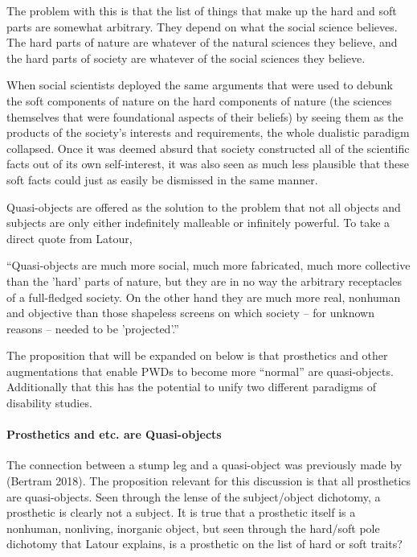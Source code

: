 \documentclass[a4paper]{article}
\begin{document}
The problem with this is that the list of things that make up the hard and
soft parts are somewhat arbitrary. They depend on what the social science
believes. The hard parts of nature are whatever of the natural sciences they
believe, and the hard parts of society are whatever of the social sciences
they believe. 

When social scientists deployed the same arguments that were used to debunk
the soft components of nature on the hard components of nature (the sciences
themselves that were foundational aspects of their beliefs) by seeing them as
the products of the society's interests and requirements, the whole dualistic
paradigm collapsed. Once it was deemed absurd that society constructed all of
the scientific facts out of its own self-interest, it was also seen as much
less plausible that these soft facts could just as easily be dismissed in the
same manner.

Quasi-objects are offered as the solution to the problem that not all objects
and subjects are only either indefinitely malleable or infinitely powerful. To
take a direct quote from Latour,

``Quasi-objects are much more social, much more fabricated, much more
collective than the 'hard' parts of nature, but they are in no way the
arbitrary receptacles of a full-fledged society. On the other hand they are
much more real, nonhuman and objective than those shapeless screens on which
society – for unknown reasons – needed to be 'projected'.''

The proposition that will be expanded on below is that prosthetics and other
augmentations that enable PWDs to become more ``normal'' are quasi-objects.
Additionally that this has the potential to unify two different paradigms of
disability studies. 

\paragraph{Prosthetics and etc. are Quasi-objects}

The connection between a stump leg and a quasi-object was previously made by
(Bertram 2018). The proposition relevant for this discussion is that all
prosthetics are quasi-objects. Seen through the lense of the subject/object
dichotomy, a prosthetic is clearly not a subject. It is true that a prosthetic
itself is a nonhuman, nonliving, inorganic object, but seen through the
hard/soft pole dichotomy that Latour explains, is a prosthetic on the list of
hard or soft traits? 
\end{document}
